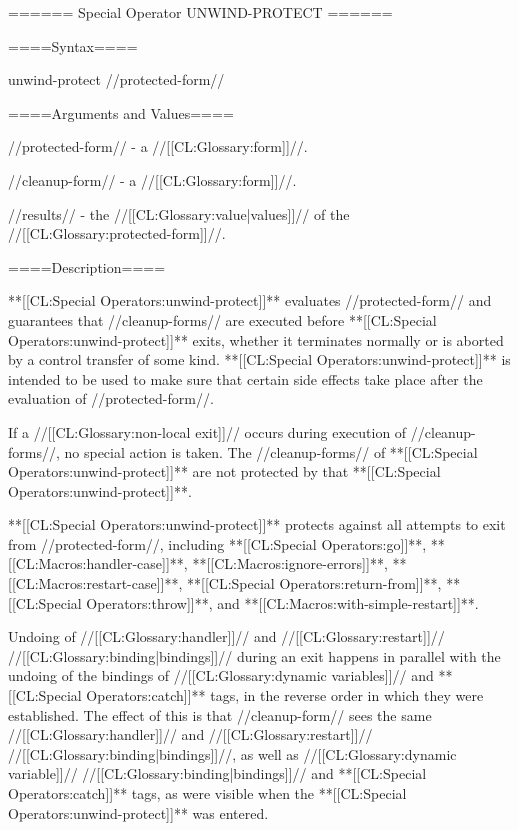 ====== Special Operator UNWIND-PROTECT ======

====Syntax====

\DefspecWithValues unwind-protect {//protected-form// } {}

====Arguments and Values====

//protected-form// - a //[[CL:Glossary:form]]//.

//cleanup-form// - a //[[CL:Glossary:form]]//.

//results// - the //[[CL:Glossary:value|values]]// of the //[[CL:Glossary:protected-form]]//.

====Description====

**[[CL:Special Operators:unwind-protect]]** evaluates //protected-form// and guarantees that //cleanup-forms// are executed before **[[CL:Special Operators:unwind-protect]]** exits, whether it terminates normally or is aborted by a control transfer of some kind. **[[CL:Special Operators:unwind-protect]]** is intended to be used to make sure that certain side effects take place after the evaluation of //protected-form//.

If a //[[CL:Glossary:non-local exit]]// occurs during execution of //cleanup-forms//, no special action is taken. The //cleanup-forms// of **[[CL:Special Operators:unwind-protect]]** are not protected by that **[[CL:Special Operators:unwind-protect]]**.

**[[CL:Special Operators:unwind-protect]]** protects against all attempts to exit from //protected-form//, including **[[CL:Special Operators:go]]**, **[[CL:Macros:handler-case]]**, **[[CL:Macros:ignore-errors]]**, **[[CL:Macros:restart-case]]**, **[[CL:Special Operators:return-from]]**, **[[CL:Special Operators:throw]]**, and **[[CL:Macros:with-simple-restart]]**.

Undoing of //[[CL:Glossary:handler]]// and //[[CL:Glossary:restart]]// //[[CL:Glossary:binding|bindings]]// during an exit happens in parallel with the undoing of the bindings of //[[CL:Glossary:dynamic variables]]// and **[[CL:Special Operators:catch]]** tags, in the reverse order in which they were established. The effect of this is that //cleanup-form// sees the same //[[CL:Glossary:handler]]// and //[[CL:Glossary:restart]]// //[[CL:Glossary:binding|bindings]]//, as well as //[[CL:Glossary:dynamic variable]]// //[[CL:Glossary:binding|bindings]]// and **[[CL:Special Operators:catch]]** tags, as were visible when the **[[CL:Special Operators:unwind-protect]]** was entered.


